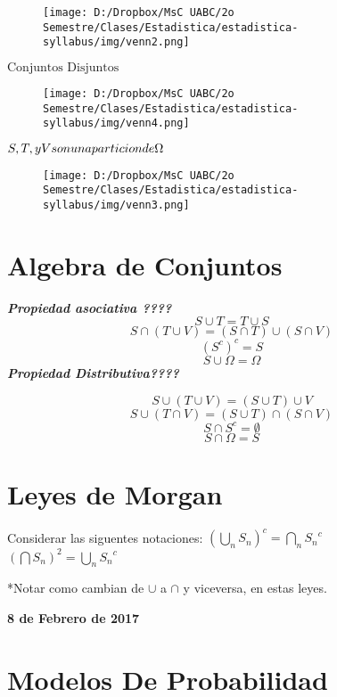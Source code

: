 \documentclass[]{book}
\begin{document}
\begin{figure}[htbp]
\centering
\texttt{[image: D:/Dropbox/MsC UABC/2o Semestre/Clases/Estadistica/estadistica-syllabus/img/venn2.png]}
\caption{}
\end{figure}

\(\text{Conjuntos Disjuntos}\)

\begin{figure}[htbp]
\centering
\texttt{[image: D:/Dropbox/MsC UABC/2o Semestre/Clases/Estadistica/estadistica-syllabus/img/venn4.png]}
\caption{}
\end{figure}

\(S,T,\space y \space V \space son \space una \space particion \space de \space \Omega\)

\begin{figure}[htbp]
\centering
\texttt{[image: D:/Dropbox/MsC UABC/2o Semestre/Clases/Estadistica/estadistica-syllabus/img/venn3.png]}
\caption{}
\end{figure}

\section{Algebra de Conjuntos}\label{algebra-de-conjuntos-1}

\textbf{\emph{Propiedad asociativa ????}} \[S \cup T = T \cup S\]
\[S \cap (T \cup V) = (S \cap T) \cup (S \cap V)\] \[(S^c)^c = S\]
\[S \cup \Omega = \Omega\] \textbf{\emph{Propiedad Distributiva????}}

\[S \cup (T \cup V) = (S \cup T)\cup V\]
\[S \cup (T \cap V) = (S \cup T)\cap (S \cap V)\]
\[S \cap S^c = \emptyset\] \[S \cap \Omega = S\]

\section{Leyes de Morgan}\label{leyes-de-morgan-1}

Considerar las siguentes notaciones:
\((\bigcup_{n}^{}S_n)^c = \bigcap_{n}^{}{S_n}^c\)\\
 \((\bigcap S_n)^2 = \bigcup_{n}^{}{S_n}^c\)

*Notar como cambian de \(\cup\) a \(\cap\) y viceversa, en estas leyes.

\textbf{8 de Febrero de 2017}

\section{Modelos De Probabilidad}\label{modelos-de-probabilidad-1}
\end{document}
